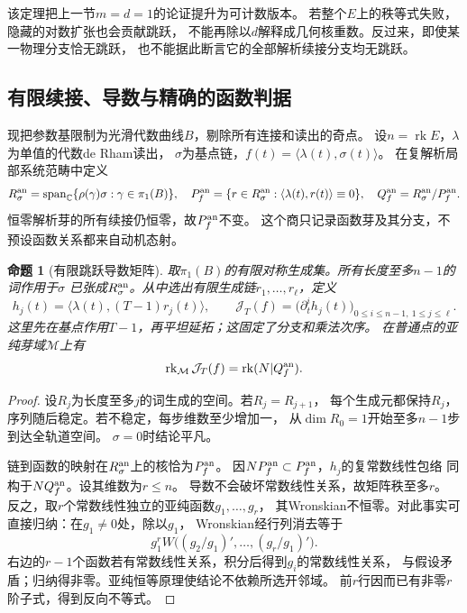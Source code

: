 \documentclass[11pt,a4paper]{ctexart}
\theoremstyle{cnplain}\newtheorem{theorem}{定理}[section]
\newtheorem{proposition}[theorem]{命题}
\theoremstyle{definition}\newtheorem{definition}[theorem]{定义}
\theoremstyle{remark}\newtheorem{remark}[theorem]{注}
\newcommand{\rk}{\operatorname{rk}}\newcommand{\im}{\operatorname{im}}
\begin{document}
该定理把上一节$m=d=1$的论证提升为可计数版本。
若整个$E$上的秩等式失败，隐藏的对数扩张也会贡献跳跃，
不能再除以$d$解释成几何核重数。反过来，即使某一物理分支恰无跳跃，
也不能据此断言它的全部解析续接分支均无跳跃。

\subsection{有限续接、导数与精确的函数判据}
现把参数基限制为光滑代数曲线$B$，剔除所有连接和读出的奇点。
设$n=\rk E$，$\lambda$为单值的代数de Rham读出，
$\sigma$为基点链，$f(t)=\langle\lambda(t),\sigma(t)\rangle$。
在复解析局部系统范畴中定义
\[
 R_\sigma^{\rm an}
   =\operatorname{span}_{\mathbb C}\{\rho(\gamma)\sigma:\gamma\in\pi_1(B)\},
 \quad
 P_f^{\rm an}
   =\{r\in R_\sigma^{\rm an}:
               \langle\lambda(t),r(t)\rangle\equiv0\},
 \quad Q_f^{\rm an}=R_\sigma^{\rm an}/P_f^{\rm an}.
\]
恒零解析芽的所有续接仍恒零，故$P_f^{\rm an}$不变。
这个商只记录函数芽及其分支，不预设函数关系都来自动机态射。

\begin{proposition}[有限跳跃导数矩阵]\label{prop:jumpjet}
取$\pi_1(B)$的有限对称生成集。所有长度至多$n-1$的词作用于$\sigma$
已张成$R_\sigma^{\rm an}$。从中选出有限生成链$r_1,\ldots,r_\ell$，定义
\[
 h_j(t)=\langle\lambda(t),(T-1)r_j(t)\rangle,\qquad
 \mathcal J_T(f)=\bigl(\partial_t^i h_j(t)\bigr)_{
                              0\leq i\leq n-1,\ 1\leq j\leq\ell}.
\]
这里先在基点作用$T-1$，再平坦延拓；这固定了分支和乘法次序。
在普通点的亚纯芽域$\mathcal M$上有
\begin{equation}\label{eq:jumpjetrank}
 \rk_{\mathcal M}\mathcal J_T(f)=\rk(N|Q_f^{\rm an}).
\end{equation}
\end{proposition}
\begin{proof}
设$R_j$为长度至多$j$的词生成的空间。若$R_j=R_{j+1}$，
每个生成元都保持$R_j$，序列随后稳定。若不稳定，每步维数至少增加一，
从$\dim R_0=1$开始至多$n-1$步到达全轨道空间。
$\sigma=0$时结论平凡。

链到函数的映射在$R_\sigma^{\rm an}$上的核恰为$P_f^{\rm an}$。
因$NP_f^{\rm an}\subset P_f^{\rm an}$，$h_j$的复常数线性包络
同构于$NQ_f^{\rm an}$。设其维数为$r\leq n$。
导数不会破坏常数线性关系，故矩阵秩至多$r$。
反之，取$r$个常数线性独立的亚纯函数$g_1,\ldots,g_r$，
其Wronskian不恒零。对此事实可直接归纳：在$g_1\ne0$处，除以$g_1$，
Wronskian经行列消去等于
\[
 g_1^r W\bigl((g_2/g_1)',\ldots,(g_r/g_1)'\bigr).
\]
右边的$r-1$个函数若有常数线性关系，积分后得到$g_i$的常数线性关系，
与假设矛盾；归纳得非零。亚纯恒等原理使结论不依赖所选开邻域。
前$r$行因而已有非零$r$阶子式，得到反向不等式。
\end{proof}
\end{document}
